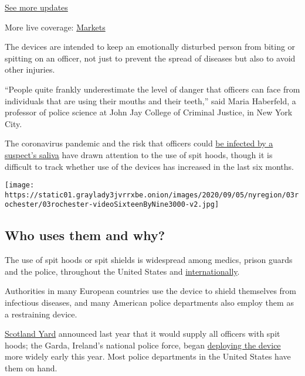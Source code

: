 \href{https://www.nytimes3xbfgragh.onion/2020/09/09/world/covid-19-coronavirus.html?action=click\&pgtype=Article\&state=default\&region=MAIN_CONTENT_1\&context=storylines_live_updates}{See
more updates}

More live coverage:
\href{https://www.nytimes3xbfgragh.onion/live/2020/09/09/business/stock-market-today-coronavirus?action=click\&pgtype=Article\&state=default\&region=MAIN_CONTENT_1\&context=storylines_live_updates}{Markets}

The devices are intended to keep an emotionally disturbed person from
biting or spitting on an officer, not just to prevent the spread of
diseases but also to avoid other injuries.

``People quite frankly underestimate the level of danger that officers
can face from individuals that are using their mouths and their teeth,''
said Maria Haberfeld, a professor of police science at John Jay College
of Criminal Justice, in New York City.

The coronavirus pandemic and the risk that officers could
\href{https://nypost.com/2020/04/18/nypd-giving-tickets-to-perps-with-coronavirus-who-spit-on-others/}{be
infected by a suspect's saliva} have drawn attention to the use of spit
hoods, though it is difficult to track whether use of the devices has
increased in the last six months.

\texttt{[image: https://static01.graylady3jvrrxbe.onion/images/2020/09/05/nyregion/03rochester/03rochester-videoSixteenByNine3000-v2.jpg]}

\hypertarget{who-uses-them-and-why}{%
\subsection{Who uses them and why?}\label{who-uses-them-and-why}}

The use of spit hoods or spit shields is widespread among medics, prison
guards and the police, throughout the United States and
\href{https://www.businessinsider.com/police-in-ireland-ramp-up-use-of-controversial-spit-hoods-2020-5}{internationally}.

Authorities in many European countries use the device to shield
themselves from infectious diseases, and many American police
departments also employ them as a restraining device.

\href{https://www.independent.co.uk/news/uk/crime/spit-hoods-police-met-london-scotland-yard-suspects-cressida-dick-crime-a8767826.html}{Scotland
Yard} announced last year that it would supply all officers with spit
hoods; the Garda, Ireland's national police force, began
\href{https://www.businessinsider.com/police-in-ireland-ramp-up-use-of-controversial-spit-hoods-2020-5}{deploying
the device} more widely early this year. Most police departments in the
United States have them on hand.

